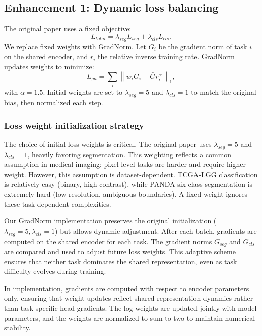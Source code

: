 \documentclass[conference,a4paper]{IEEEtran}
\begin{document}
\subsection{Enhancement 1: Dynamic loss balancing}
The original paper uses a fixed objective:
\begin{equation}
L_{total} = \lambda_{seg} L_{seg} + \lambda_{cls} L_{cls}.
\end{equation}
We replace fixed weights with GradNorm. Let $G_i$ be the gradient norm of task $i$ on the shared encoder, and $r_i$ the relative inverse training rate. GradNorm updates weights to minimize:
\begin{equation}
L_{gn} = \sum_i \left\lVert w_i G_i - \bar{G} r_i^{\alpha} \right\rVert_1,
\end{equation}
with $\alpha=1.5$. Initial weights are set to $\lambda_{seg}=5$ and $\lambda_{cls}=1$ to match the original bias, then normalized each step.

\subsubsection{Loss weight initialization strategy}
The choice of initial loss weights is critical. The original paper uses $\lambda_{seg}=5$ and $\lambda_{cls}=1$, heavily favoring segmentation. This weighting reflects a common assumption in medical imaging: pixel-level tasks are harder and require higher weight. However, this assumption is dataset-dependent. TCGA-LGG classification is relatively easy (binary, high contrast), while PANDA six-class segmentation is extremely hard (low resolution, ambiguous boundaries). A fixed weight ignores these task-dependent complexities.

Our GradNorm implementation preserves the original initialization ($\lambda_{seg}=5, \lambda_{cls}=1$) but allows dynamic adjustment. After each batch, gradients are computed on the shared encoder for each task. The gradient norms $G_{seg}$ and $G_{cls}$ are compared and used to adjust future loss weights. This adaptive scheme ensures that neither task dominates the shared representation, even as task difficulty evolves during training.

In implementation, gradients are computed with respect to encoder parameters only, ensuring that weight updates reflect shared representation dynamics rather than task-specific head gradients. The log-weights are updated jointly with model parameters, and the weights are normalized to sum to two to maintain numerical stability.
\end{document}

